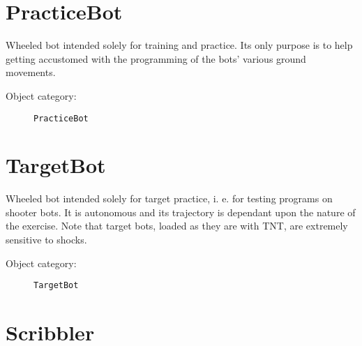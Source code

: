 \section{PracticeBot}

Wheeled bot intended solely for training and practice. Its only purpose is to help getting accustomed with the programming of the bots' various ground movements.

\begin{description}
    \item[Object category:] \texttt{PracticeBot}
\end{description}


\section{TargetBot}

Wheeled bot intended solely for target practice, i. e. for testing programs on shooter bots. It is autonomous and its trajectory is dependant upon the nature of the exercise.
Note that target bots, loaded as they are with TNT, are extremely sensitive to shocks.
\begin{description}
    \item[Object category:] \texttt{TargetBot}
\end{description}


\section{Scribbler}


